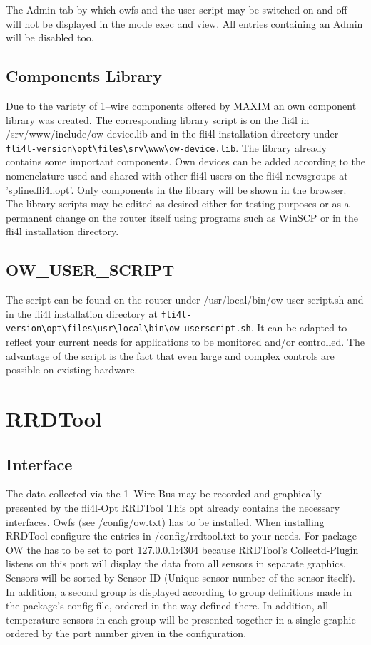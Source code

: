 The Admin tab by which owfs and the user-script may be switched on and off
will not be displayed in the mode \glqq{}exec\grqq{} and \glqq{}view\grqq{}.
All entries containing an \glqq{}Admin\grqq{} will be disabled too.

\subsection{Components Library}
Due to the variety of 1--wire components offered by MAXIM an own component
library was created. The corresponding library script is on the fli4l
in /srv/www/include/ow-device.lib and in the fli4l installation directory under
\verb!fli4l-version\opt\files\srv\www\ow-device.lib!. The library already
contains some important components. Own devices can be added according to the
nomenclature used and shared with other fli4l users on the fli4l newsgroups
at 'spline.fli4l.opt'. Only components in the library will be shown in the
browser. The library scripts may be edited as desired either for testing
purposes or as a permanent change on the router itself using programs such
as \glqq{}WinSCP\grqq{} or in the fli4l installation directory.

{
\subsection{OW\_USER\_SCRIPT}
}

The script can be found on the router under /usr/local/bin/ow-user-script.sh and
in the fli4l installation directory at \verb!fli4l-version\opt\files\usr\local\bin\ow-userscript.sh!.
It can be adapted to reflect your current needs for applications to be monitored
and/or controlled. The advantage of the script is the fact that even large and
complex controls are possible on existing hardware.

{
\section{RRDTool}
}
\subsection{Interface}
The data collected via the 1--Wire-Bus may be recorded and graphically presented by
the fli4l-Opt \glqq{}RRDTool\grqq{} This opt already contains the necessary interfaces.
Owfs (see /config/ow.txt) has to be installed. When installing RRDTool configure the
entries in /config/rrdtool.txt to your needs. For package OW the  has
to be set to port 127.0.0.1:4304 because RRDTool's Collectd-Plugin listens on this
port will display the data from all sensors in separate graphics.
Sensors will be sorted by Sensor ID (Unique sensor number of the sensor itself).
In addition, a second group is displayed according to group definitions made in the
package's config file, ordered in the way defined there.
In addition, all temperature sensors in each group will be presented together in a
single graphic ordered by the port number given in the configuration.

